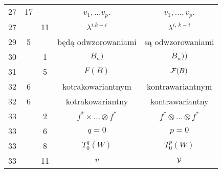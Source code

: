 \documentclass[a4paper,11pt]{article}
\begin{document}
\begin{center}
\begin{tabular}{|c|c|c|c|c|}
    27  & 17 & & $v_{ 1 }, \ldots v_{ p }$. & $v_{ 1 }, \ldots, v_{ p }$. \\
    27  & & 11 & $\lambda^{ i. k - i }$ & $\lambda^{ i,\, k - i }$ \\
    29  & \hphantom{0}5 & & będą odwzorowaniami & są odwzorowaniami \\
    30  & & \hphantom{0}1 & $B_{ n } )$ & $B_{ n } ) )$ \\
    31  & & \hphantom{0}5 & $F( B )$ & $\mathcal{F}( B )$ \\
    32  & \hphantom{0}6 & & kotrakowariantnym & kontrawariantnym \\
    32  & \hphantom{0}6 & & kotrakowariantny & kontrawariantny \\
    33  & & \hphantom{0}2 & $f^{ * } \times \ldots \otimes f^{ * }$
    & $f^{ * } \otimes \ldots \otimes f^{ * }$ \\
    33  & & \hphantom{0}6 & $q = 0$ & $p = 0$ \\
    33  & & \hphantom{0}8 & $T_{ 0 }^{ q }( W )$ & $T_{ 0 }^{ p }( W )$ \\
    33  & & 11 & $v$ & $\mathcal{V}$ \\
    \hline
  \end{tabular}





  \newpage


\end{center}
\end{document}
